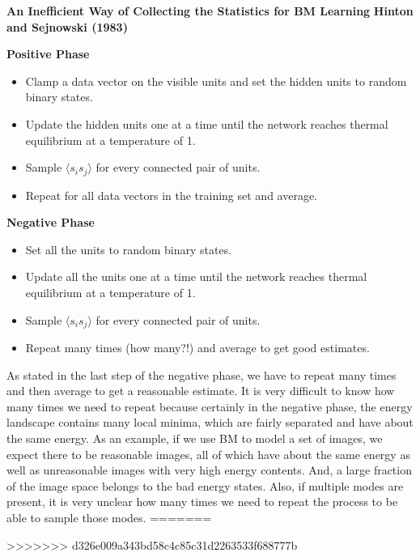 \documentclass{article}
\begin{document}
\begin{center}
\textbf{An Inefficient Way of Collecting the Statistics for BM Learning} \newline
\textbf{Hinton and Sejnowski (1983)}
\end{center}
\begin{multicols}{2}
\begin{center}
\textbf{Positive Phase}
\end{center}
\begin{itemize}
	\item Clamp a data vector on the visible units and set the hidden units to random binary states.
	\item Update the hidden units one at a time until the network reaches thermal equilibrium at a temperature of 1.
	\item Sample $\langle s_i s_j \rangle$ for every connected pair of units.
	\item Repeat for all data vectors in the training set and average.
\end{itemize}
\columnbreak
\begin{center}
\textbf{Negative Phase}
\end{center}
\begin{itemize}
	\item Set all the units to random binary states.
	\item Update all the units one at a time until the network reaches thermal equilibrium at a temperature of 1.
	\item Sample $\langle s_i s_j \rangle$ for every connected pair of units.
	\item Repeat many times (how many?!) and average to get good estimates.
\end{itemize}
\end{multicols}

As stated in the last step of the negative phase, we have to repeat many times and then average to get a reasonable estimate. It is very difficult to know how many times we need to repeat because certainly in the negative phase, the energy landscape contains many local minima, which are fairly separated and have about the same energy. As an example, if we use BM to model a set of images, we expect there to be reasonable images, all of which have about the same energy as well as unreasonable images with very high energy contents. And, a large fraction of the image space belongs to the bad energy states. Also, if multiple modes are present, it is very unclear how many times we need to repeat the process to be able to sample those modes.
=======

>>>>>>> d326e009a343bd58c4c85c31d2263533f688777b
\end{document}
